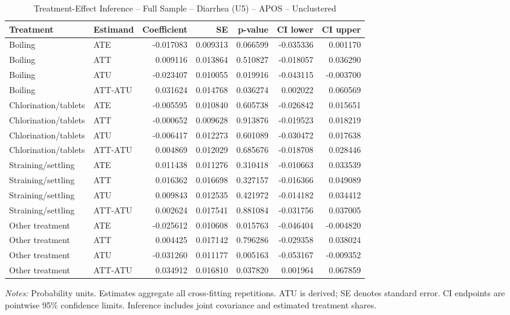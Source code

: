 \begin{table}[htbp]
\centering
\caption{Treatment-Effect Inference -- Full Sample -- Diarrhea (U5) -- APOS -- Unclustered}
\label{tab:inference-diarrhea-APOS-iid}
\scriptsize
\begin{adjustbox}{max width=\linewidth}
\begin{tabular}{llrrrrr}
\toprule
Treatment & Estimand & Coefficient & SE & p-value & CI lower & CI upper \\
\midrule
Boiling & ATE & -0.017083 & 0.009313 & 0.066599 & -0.035336 & 0.001170 \\
Boiling & ATT & 0.009116 & 0.013864 & 0.510827 & -0.018057 & 0.036290 \\
Boiling & ATU & -0.023407 & 0.010055 & 0.019916 & -0.043115 & -0.003700 \\
Boiling & ATT-ATU & 0.031624 & 0.014768 & 0.036274 & 0.002022 & 0.060569 \\
Chlorination/tablets & ATE & -0.005595 & 0.010840 & 0.605738 & -0.026842 & 0.015651 \\
Chlorination/tablets & ATT & -0.000652 & 0.009628 & 0.913876 & -0.019523 & 0.018219 \\
Chlorination/tablets & ATU & -0.006417 & 0.012273 & 0.601089 & -0.030472 & 0.017638 \\
Chlorination/tablets & ATT-ATU & 0.004869 & 0.012029 & 0.685676 & -0.018708 & 0.028446 \\
Straining/settling & ATE & 0.011438 & 0.011276 & 0.310418 & -0.010663 & 0.033539 \\
Straining/settling & ATT & 0.016362 & 0.016698 & 0.327157 & -0.016366 & 0.049089 \\
Straining/settling & ATU & 0.009843 & 0.012535 & 0.421972 & -0.014182 & 0.034412 \\
Straining/settling & ATT-ATU & 0.002624 & 0.017541 & 0.881084 & -0.031756 & 0.037005 \\
Other treatment & ATE & -0.025612 & 0.010608 & 0.015763 & -0.046404 & -0.004820 \\
Other treatment & ATT & 0.004425 & 0.017142 & 0.796286 & -0.029358 & 0.038024 \\
Other treatment & ATU & -0.031260 & 0.011177 & 0.005163 & -0.053167 & -0.009352 \\
Other treatment & ATT-ATU & 0.034912 & 0.016810 & 0.037820 & 0.001964 & 0.067859 \\
\bottomrule
\end{tabular}

\end{adjustbox}
\par\smallskip
\begin{minipage}{\linewidth}\scriptsize \textit{Notes:} Probability units. Estimates aggregate all cross-fitting repetitions. ATU is derived; SE denotes standard error. CI endpoints are pointwise 95\% confidence limits. Inference includes joint covariance and estimated treatment shares. \end{minipage}
\end{table}
